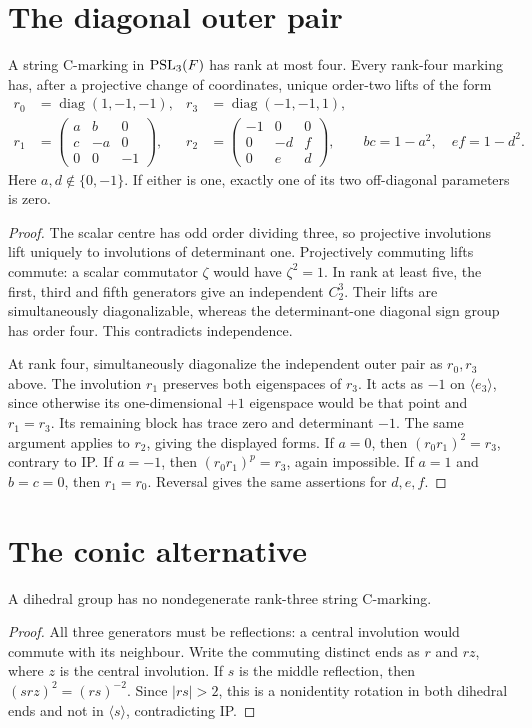 \documentclass[11pt]{article}
\begin{document}
\section*{The diagonal outer pair}
\begin{lemma}\label{odd-bound}
A string C-marking in $\operatorname{PSL}_3(F)$ has rank at most four. Every
rank-four marking has, after a projective change of coordinates,
unique order-two lifts of the form
\begin{align*}
 r_0&=\operatorname{diag}(1,-1,-1),&
 r_3&=\operatorname{diag}(-1,-1,1),\\
 r_1&=\begin{pmatrix}a&b&0\\c&-a&0\\0&0&-1\end{pmatrix},&
 r_2&=\begin{pmatrix}-1&0&0\\0&-d&f\\0&e&d\end{pmatrix},
 \qquad bc=1-a^2,\quad ef=1-d^2.
\end{align*}
Here $a,d\notin\{0,-1\}$. If either is one, exactly one of its two
off-diagonal parameters is zero.
\end{lemma}
\begin{proof}
The scalar centre has odd order dividing three, so projective involutions
lift uniquely to involutions of determinant one. Projectively commuting
lifts commute: a scalar commutator $\zeta$ would have $\zeta^2=1$.
In rank at least five, the first, third and fifth generators give an
independent $C_2^3$. Their lifts are simultaneously diagonalizable,
whereas the determinant-one diagonal sign group has order four. This
contradicts independence.

At rank four, simultaneously diagonalize the independent outer pair as
$r_0,r_3$ above. The involution $r_1$ preserves both eigenspaces of
$r_3$. It acts as $-1$ on $\langle e_3\rangle$, since otherwise its
one-dimensional $+1$ eigenspace would be that point and $r_1=r_3$.
Its remaining block has trace zero and determinant $-1$. The same
argument applies to $r_2$, giving the displayed forms.
If $a=0$, then $(r_0r_1)^2=r_3$, contrary to IP. If $a=-1$, then
$(r_0r_1)^p=r_3$, again impossible. If $a=1$ and $b=c=0$, then
$r_1=r_0$. Reversal gives the same assertions for $d,e,f$.
\end{proof}

\section*{The conic alternative}
\begin{lemma}\label{dihedral}
A dihedral group has no nondegenerate rank-three string C-marking.
\end{lemma}
\begin{proof}
All three generators must be reflections: a central involution would
commute with its neighbour. Write the commuting distinct ends as $r$
and $rz$, where $z$ is the central involution. If $s$ is the middle
reflection, then $(s r z)^2=(rs)^{-2}$. Since $|rs|>2$, this is a
nonidentity rotation in both dihedral ends and not in $\langle s\rangle$,
contradicting IP.
\end{proof}
\end{document}
